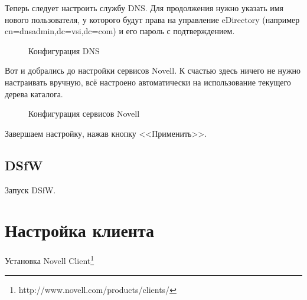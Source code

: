 Теперь следует настроить службу DNS. Для продолжения нужно указать имя нового пользователя, у которого будут права на управление eDirectory (например cn=dnsadmin,dc=vsi,dc=com) и его пароль с подтверждением.
\begin{figure}[H]
\caption{Конфигурация DNS}
\end{figure}
\clearpage

Вот и добрались до настройки сервисов Novell. К счастью здесь ничего не нужно настраивать вручную, всё настроено автоматически на использование текущего дерева каталога.
\begin{figure}[H]
\caption{Конфигурация сервисов Novell}
\end{figure}
Завершаем настройку, нажав кнопку <<Применить>>.
\clearpage

\subsection{DSfW}
Запуск DSfW.

\section{Настройка клиента}
Установка Novell Client\footnote{http://www.novell.com/products/clients/}